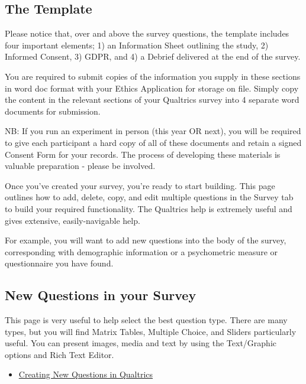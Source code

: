 \documentclass[
  letterpaper,
  DIV=11,
  numbers=noendperiod]{scrartcl}
\providecommand{\tightlist}{%
  \setlength{\itemsep}{0pt}\setlength{\parskip}{0pt}}\usepackage{longtable,booktabs,array}
\begin{document}
\subsection{The Template}\label{the-template}

Please notice that, over and above the survey questions, the template
includes four important elements; 1) an Information Sheet outlining the
study, 2) Informed Consent, 3) GDPR, and 4) a Debrief delivered at the
end of the survey.

You are required to submit copies of the information you supply in these
sections in word doc format with your Ethics Application for storage on
file. Simply copy the content in the relevant sections of your Qualtrics
survey into 4 separate word documents for submission.

NB: If you run an experiment in person (this year OR next), you will be
required to give each participant a hard copy of all of these documents
and retain a signed Consent Form for your records. The process of
developing these materials is valuable preparation - please be involved.

Once you've created your survey, you're ready to start building. This
page outlines how to add, delete, copy, and edit multiple questions in
the Survey tab to build your required functionality. The Qualtrics help
is extremely useful and gives extensive, easily-navigable help.

For example, you will want to add new questions into the body of the
survey, corresponding with demographic information or a psychometric
measure or questionnaire you have found.

\subsection{New Questions in your
Survey}\label{new-questions-in-your-survey}

This page is very useful to help select the best question type. There
are many types, but you will find Matrix Tables, Multiple Choice, and
Sliders particularly useful. You can present images, media and text by
using the Text/Graphic options and Rich Text Editor.

\begin{itemize}
\tightlist
\item
  \href{https://www.qualtrics.com/support/survey-platform/survey-module/editing-questions/creating-questions/?parent=p0030\#AddingNewQuestions}{Creating
  New Questions in Qualtrics}
\end{itemize}
\end{document}

